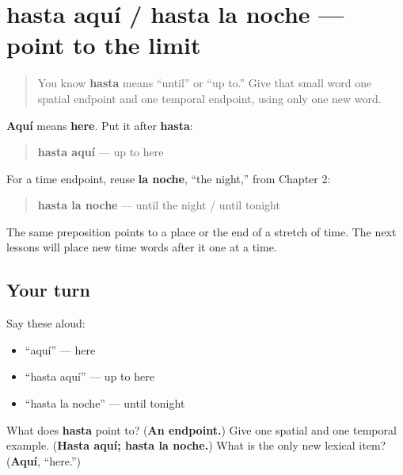 \section[hasta aquí / hasta la noche]{hasta aquí / hasta la noche — point to the limit}

\label{lesson:ES-C05-hasta-limits}



\begin{quote}
You know \textbf{hasta} means “until” or “up to.” Give that small word one spatial endpoint and one temporal endpoint, using only one new word.
\end{quote}

\begin{grammarlens}[title={Grammar Lens: endpoints in space and time}]
\textbf{Aquí} means \textbf{here}. Put it after \textbf{hasta}:

\begin{quote}
\textbf{hasta aquí} — up to here
\end{quote}

For a time endpoint, reuse \textbf{la noche}, “the night,” from Chapter 2:

\begin{quote}
\textbf{hasta la noche} — until the night / until tonight
\end{quote}

The same preposition points to a place or the end of a stretch of time. The next lessons will place new time words after it one at a time.
\end{grammarlens}

\subsection*{Your turn}
Say these aloud:

\begin{itemize}
\raggedright
  \item “aquí” — here
  \item “hasta aquí” — up to here
  \item “hasta la noche” — until tonight
\end{itemize}

\begin{tcolorbox}[breakable,colback=teal!4,colframe=teal!35!black,title={Before you move on}]
What does \textbf{hasta} point to? (\textbf{An endpoint.}) Give one spatial and one temporal example. (\textbf{Hasta aquí; hasta la noche.}) What is the only new lexical item? (\textbf{Aquí}, “here.”)
\end{tcolorbox}
